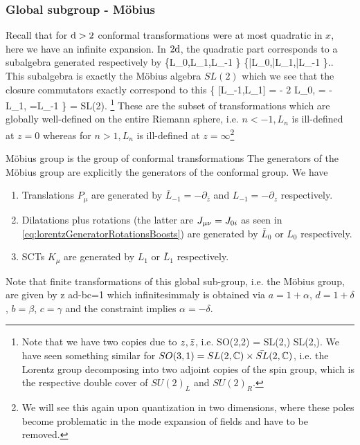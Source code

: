 \subsubsection{Global subgroup - Möbius}
Recall that for $\mathrm{d}>2$ conformal transformations were at most quadratic in $x$, here we have an infinite expansion. In $2\mathrm{d}$, the quadratic part corresponds to a subalgebra generated respectively by
\bse 
\{L_0,L_1,L_{-1} \}\quad {} \quad \{\bar{L}_0,\bar{L}_1,\bar{L}_{-1} \}..
\ese 
This subalgebra is exactly the Möbius algebra $SL(2)$ which we see that the closure commutators exactly correspond to this
\bse 
\left\{ [L_{-1},L_1] = - 2 L_0, \; [L_0,L_1] = - L_1, \; [L_0, L_{-1}]=L_{-1}  \right\} = SL(2).
\ese\footnote{Note that we have two copies due to $z,\bar{z}$, i.e. \bse 
SO(2,2) = SL(2,\mR) \times SL(2,\mR).
\ese
We have seen something similar for $SO(3,1)=SL(2,\mathbb{C})\times \bar{SL}(2,\mathbb{C})$, i.e. the Lorentz group decomposing into two adjoint copies of the spin group, which is the respective double cover of $SU(2)_L$ and $SU(2)_R$. }
These are the subset of transformations which are globally well-defined on the entire Riemann sphere, i.e. $n<-1, L_n$ is ill-defined at $z=0$ whereas for $n>1, L_n$ is ill-defined at $z=\infty$\footnote{We will see this again upon quantization in two dimensions, where these poles become problematic in the mode expansion of fields and have to be removed.}\\
\begin{mybox}{Möbius group is the group of conformal transformations}
	The generators of the Möbius group are explicitly the generators of the conformal group. We have 
	\begin{enumerate}
	\item Translations $P_\mu$ are generated by $\bar{L}_{-1}=- \partial_{\bar{z}}$ and $L_{-1}= - \partial_z$ respectively.
	\item Dilatations plus rotations (the latter are $J_{\mu \nu} = J_{0i}$ as seen in \ref{eq:lorentzGeneratorRotationsBoosts}) are generated by $\bar{L}_0$ or $L_0$ respectively.
	\item SCTs $K_\mu$ are generated by $L_1$ or $\bar{L}_1$ respectively.
	\end{enumerate}
\end{mybox}
Note that finite transformations of this global sub-group, i.e. the Möbius group, are given by
\bse 
z \rightarrow {} \quad {} \quad ad-bc=1
\ese 
which infinitesimmaly is obtained via $a=1+\alpha$, $d=1+\delta$, $b=\beta$, $c=\gamma$ and the constraint implies $\alpha=-\delta$.





















